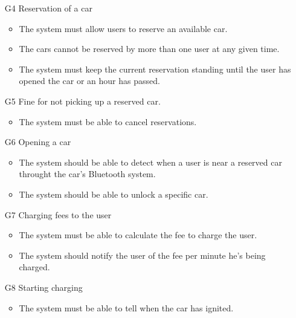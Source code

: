 \begin{itemize}
\begin{itemize}
		\end{itemize}
	\item [G4] Reservation of a car %
		\begin{itemize}
			\item The system must allow users to reserve an available car.
			\item The cars cannot be reserved by more than one user at any given time.
			\item The system must keep the current reservation standing until the user has opened the car or an hour has passed.
		\end{itemize}
	\item [G5] Fine for not picking up a reserved car. %
		\begin{itemize}
			\item The system must be able to cancel reservations.
		\end{itemize}
	\item [G6] Opening a car %
		\begin{itemize}
			\item The system should be able to detect when a user is near a reserved car throught the car's Bluetooth system.
			\item The system should be able to unlock a specific car.
		\end{itemize}
	\item [G7] Charging fees to the user %
		\begin{itemize}
			\item The system must be able to calculate the fee to charge the user.
			\item The system should notify the user of the fee per minute he's being charged.
		\end{itemize}
	\item [G8] Starting charging %
		\begin{itemize}
			\item The system must be able to tell when the car has ignited. 

\end{itemize}
\end{itemize}
